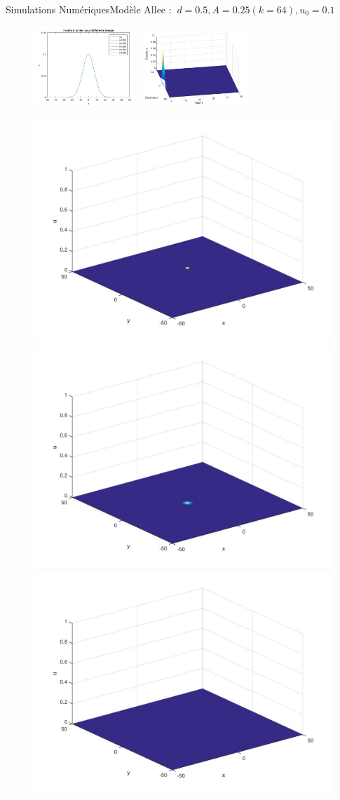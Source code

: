 \documentclass[10pt]{beamer}
\begin{document}
\begin{frame}{Simulations Numériques}{Modèle Allee : $\ d=0.5, A=0.25 (k=64), u_0=0.1$}
\begin{figure}[H]
	\centering
	\includegraphics[width=0.40\linewidth, height=3cm]{Allee/F2311}\hfill
	\includegraphics[width=0.55\linewidth, height=3cm]{Allee/F4311}
\end{figure}
\begin{figure}[H]
	\centering
	\includegraphics[width=0.3\linewidth]{Allee/311__1_}\hfill
    \includegraphics[width=0.3\linewidth]{Allee/311__2_}\hfill
	\includegraphics[width=0.3\linewidth]{Allee/311__3_}
\end{figure}
\end{frame}
\end{document}
